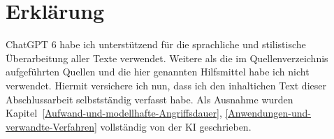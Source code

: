 \section*{Erklärung}

ChatGPT 6 habe ich unterstützend für die sprachliche und stilistische Überarbeitung aller Texte verwendet.
Weitere als die im Quellenverzeichnis aufgeführten Quellen und die hier genannten Hilfsmittel habe ich nicht verwendet.
Hiermit versichere ich nun, dass ich den inhaltichen Text dieser Abschlussarbeit selbstständig verfasst habe. 
Als Ausnahme wurden Kapitel~\ref{Aufwand-und-modellhafte-Angriffsdauer}, \ref{Anwendungen-und-verwandte-Verfahren} vollständig von der KI geschrieben.

\vspace{2\baselineskip}

\vspace{3\baselineskip}
